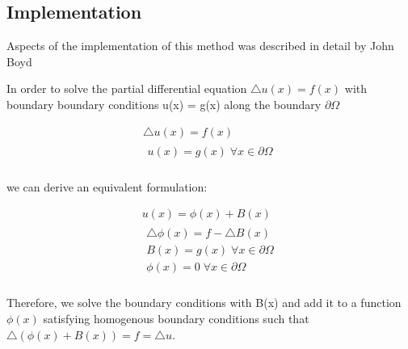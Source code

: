 \documentclass[final]{siamart1116}
\numberwithin{theorem}{section}
\begin{document}
\subsection{Implementation}

Aspects of the implementation of this method was described in detail by John Boyd \cite{Boyd}


In order to solve the partial differential equation $\bigtriangleup u(x) = f(x)$
with boundary boundary conditions u(x) = g(x) along the boundary $\partial \Omega$

\begin{gather}
  \bigtriangleup u(x) = f(x)\label{pde} \\  
  \begin{split}
    u(x) = g(x)  \; \forall x \in \partial \Omega \nonumber \\
  \end{split}
\end{gather}


we can derive an equivalent formulation:

\begin{gather}
u(x) = \phi(x) + B(x) \label{boyd} \\
  \begin{split}
  \bigtriangleup \phi(x) = f - \bigtriangleup B(x) \nonumber \\
  B(x) = g(x) \; \forall x \in \partial \Omega \nonumber \\
  \phi(x) = 0 \; \forall x \in \partial \Omega \nonumber \\
  \end{split}
\end{gather}

Therefore, we solve the boundary conditions with B(x) and add it to a function $\phi(x)$ satisfying homogenous boundary conditions such that $ \bigtriangleup (\phi(x) + B(x)) = f = \bigtriangleup u$. 
\end{document}

